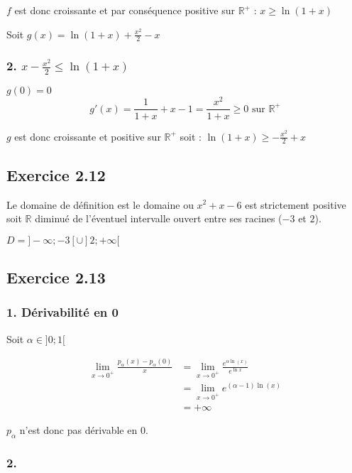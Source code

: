 \documentclass{report}
\begin{document}
$f$ est donc croissante et par conséquence positive sur $\mathbb{R}^{+}$ : $x \geq \ln(1+x)$

Soit $g(x) = \ln(1+x) + \frac{x^2}{2} - x$

\subsubsection*{2. $x -\frac{x^2}{2} \leq \ln(1+x)$}
$g(0) = 0$
\begin{displaymath}
	g'(x) = \frac{1}{1+x} + x - 1 = \frac{x^2}{1+x} \geq 0 \text{ sur } \mathbb{R}^{+}
\end{displaymath}

$g$ est donc croissante et positive sur $\mathbb{R}^{+}$ soit : $\ln(1+x) \geq -\frac{x^2}{2} + x$

\subsection*{Exercice 2.12}

Le domaine de définition est le domaine ou $x^2 + x -6$ est strictement positive soit $\mathbb{R}$ diminué de l'éventuel
intervalle ouvert entre ses racines ($-3$ et $2$).

$D = ]-\infty ; -3 [ \cup ]2; +\infty[$

\subsection*{Exercice 2.13}
\subsubsection*{1. Dérivabilité en 0}

Soit $\alpha \in ]0;1[$

\begin{equation*}
	\begin{split}
		\lim_{x \rightarrow 0^{+}} \frac{p_{\alpha}(x) - p_{\alpha}(0)}{x}
		&= \lim_{x \rightarrow 0^{+}} \frac{e^{\alpha \ln(x)}}{e^{\ln x}} \\
		&= \lim_{x \rightarrow 0^{+}} e^{(\alpha-1) \ln(x)} \\
		&= +\infty
	\end{split}
\end{equation*}

$p_\alpha$ n'est donc pas dérivable en $0$.

\subsubsection*{2.}
\end{document}
